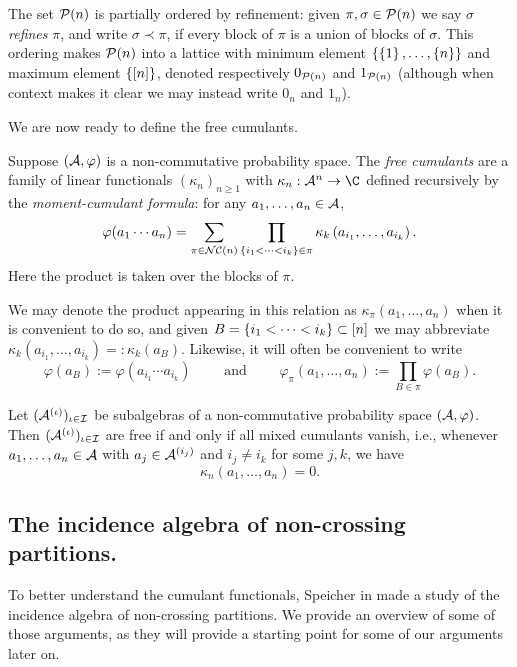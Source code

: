 The set $\mathcal{P}(n)$ is partially ordered by refinement: given $\pi, \sigma \in \mathcal{P}(n)$ we say $\sigma$ \emph{refines} $\pi$, and write $\sigma \prec \pi$, if every block of $\pi$ is a union of blocks of $\sigma$.
This ordering makes $\mathcal{P}(n)$ into a lattice with minimum element $\left\{\left\{1\right\}, \ldots, \left\{n\right\}\right\}$ and maximum element $\left\{[n]\right\}$, denoted respectively $0_{\mathcal{P}(n)}$ and $1_{\mathcal{P}(n)}$ (although when context makes it clear we may instead write $0_n$ and $1_n$).

We are now ready to define the free cumulants.
\begin{definition}
	Suppose $(\mathcal{A}, \varphi)$ is a non-commutative probability space.
	The \emph{free cumulants} are a family of linear functionals $(\kappa_n)_{n\geq 1}$ with $\kappa_n : \A^n \to \C$ defined recursively by the \emph{moment-cumulant formula}: for any $a_1, \ldots, a_n \in \mathcal{A}$,
	$$\varphi(a_1\cdots a_n) = \sum_{\pi\in\mathcal{NC}(n)}\prod_{\left\{i_1 < \cdots < i_k\right\} \in \pi}\kappa_{k}\left(a_{i_1}, \ldots, a_{i_k}\right).$$
	Here the product is taken over the blocks of $\pi$.
\end{definition}
	We may denote the product appearing in this relation as $\kappa_\pi(a_1, \ldots, a_n)$ when it is convenient to do so, and given $B = \left\{i_1 < \cdots < i_k\right\} \subset [n]$ we may abbreviate $\kappa_k(a_{i_1}, \ldots, a_{i_k}) =: \kappa_k(a_B)$.
	Likewise, it will often be convenient to write
	$$\varphi(a_B) := \varphi(a_{i_1}\cdots a_{i_k}) \qquad\text{ and }\qquad \varphi_\pi(a_1, \ldots, a_n) := \prod_{B\in\pi} \varphi(a_B).$$

\begin{theorem}
	\label{thm:cumufree}
	Let $(\mathcal{A}^{(\iota)})_{\iota\in\mathcal{I}}$ be subalgebras of a non-commutative probability space $(\mathcal{A}, \varphi)$.
	Then $(\mathcal{A}^{(\iota)})_{\iota\in\mathcal{I}}$ are free if and only if all mixed cumulants vanish, i.e., whenever $a_1, \ldots, a_n \in \mathcal{A}$ with $a_j \in \mathcal{A}^{(i_j)}$ and $i_j \neq i_k$ for some $j, k$, we have
	$$\kappa_n(a_1, \ldots, a_n) = 0.$$
\end{theorem}

\subsection{The incidence algebra of non-crossing partitions.}
To better understand the cumulant functionals, Speicher in \cite{speicher1994} made a study of the incidence algebra of non-crossing partitions.
We provide an overview of some of those arguments, as they will provide a starting point for some of our arguments later on.


